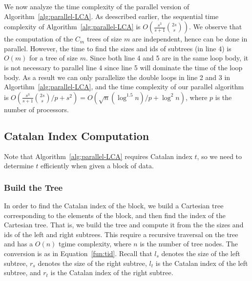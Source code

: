 We now analyze the time complexity of the parallel version of
Algorithm~\ref{alg:parallel-LCA}.  As deescribed earlier, the
sequential time complexity of Algorithm~\ref{alg:parallel-LCA} is
$O(\frac{s^3}{s+1} \binom{2s}{s})$.  We observe that the computation
of the $C_m$ trees of size $m$ are independent, hence can be done in
parallel.  However, the time to find the sizes and ids of subtrees (in
line 4) is $O(m)$ for a tree of size $m$.  Since both line 4 and 5 are
in the same loop body, it is not necessary to parallel line 4 since
line 5 will dominate the time of the loop body.  As a result we can
only parallelize the double loops in line 2 and 3 in
Algortihm~\ref{alg:parallel-LCA}, and the time complexity of our
parallel algorithm is $O(\frac{s^3}{s+1} \binom{2s}{s} / p + s^2) =
O(\sqrt{n} (\log ^{1.5} n) / p + \log^2 n )$, where $p$ is the number
of processors.




\subsection{Catalan Index Computation}

Note that Algorithm~\ref{alg:parallel-LCA} requires Catalan index $t$,
so we need to determine $t$ efficiently when given a block of data.


\subsubsection{Build the Tree}

In order to find the Catalan index of the block, we build a Cartesian
tree corresponding to the elements of the block, and then find the
index of the Cartesian tree.  That is, we build the tree and compute
it from the the sizes and ids of the left and right subtrees.  This
require a recursive traversal on the tree and has a $O(n)$ tgime
complexity, where $n$ is the number of tree nodes.  The conversion is
as in Equation~\ref{fun:tid}.  Recall that $l_s$ denotes the size of
the left subtree, $r_s$ denotes the size of the right subtree, $l_t$
is the Catalan index of the left subtree, and $r_t$ is the Catalan
index of the right subtree.

